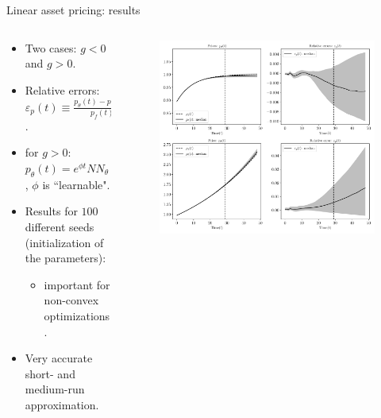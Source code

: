 \documentclass[aspectratio=169,10pt]{beamer}
\begin{document}
\begin{frame}{Linear asset pricing: results}
	\begin{columns}
		\begin{column}{0.5\textwidth}
			\begin{itemize}
				\item Two cases: $g<0$ and $g>0$.
				\vspace{0.05in}
				\item Relative errors: $\varepsilon_p(t)\equiv \frac{p_\theta(t)-p_f(t)}{p_f(t)}$.
				\vspace{0.05in}
				\item for $g>0$: $p_\theta(t) = e^{\phi t}
			 NN_\theta(t)$, $\phi$ is ``learnable".
			 	\vspace{0.05in}
				\item Results for $100$ different seeds (initialization of the parameters):
				\begin{itemize}
					\item important for non-convex optimizations.
				\end{itemize} 
				\vspace{0.05in}
				\item Very accurate short- and medium-run approximation.
			\end{itemize}
		\end{column}
		\begin{column}{0.5\textwidth}
			\begin{figure}[t!]
				\centering
				\includegraphics[width=\textwidth]{figs/asset_pricing_sequential_combined.pdf}
				\vspace{-7mm}
			\end{figure}
		\end{column}
	\end{columns}
\end{frame}
\end{document}
